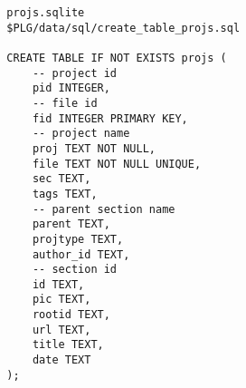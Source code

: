  
 
 
 
 

\begin{verbatim}
  projs.sqlite 
  $PLG/data/sql/create_table_projs.sql

  CREATE TABLE IF NOT EXISTS projs (
      -- project id
      pid INTEGER,
      -- file id
      fid INTEGER PRIMARY KEY,
      -- project name
      proj TEXT NOT NULL, 
      file TEXT NOT NULL UNIQUE,
      sec TEXT, 
      tags TEXT, 
      -- parent section name
      parent TEXT,
      projtype TEXT,
      author_id TEXT,
      -- section id
      id TEXT,
      pic TEXT,
      rootid TEXT,
      url TEXT,
      title TEXT,
      date TEXT
  );
\end{verbatim}
